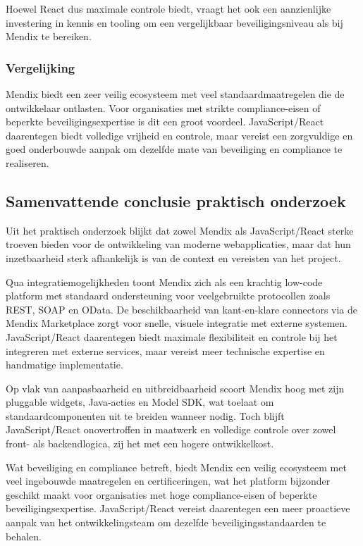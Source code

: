 Hoewel React dus maximale controle biedt, vraagt het ook een aanzienlijke investering in kennis en tooling om een vergelijkbaar beveiligingsniveau als bij Mendix te bereiken.


\subsubsection{Vergelijking}

Mendix biedt een zeer veilig ecosysteem met veel standaardmaatregelen die de ontwikkelaar ontlasten. Voor organisaties met strikte compliance-eisen of beperkte beveiligingsexpertise is dit een groot voordeel. JavaScript/React daarentegen biedt volledige vrijheid en controle, maar vereist een zorgvuldige en goed onderbouwde aanpak om dezelfde mate van beveiliging en compliance te realiseren.


\subsection{Samenvattende conclusie praktisch onderzoek}
Uit het praktisch onderzoek blijkt dat zowel Mendix als JavaScript/React sterke troeven bieden voor de ontwikkeling van moderne webapplicaties, maar dat hun inzetbaarheid sterk afhankelijk is van de context en vereisten van het project.

Qua integratiemogelijkheden toont Mendix zich als een krachtig low-code platform met standaard ondersteuning voor veelgebruikte protocollen zoals REST, SOAP en OData. De beschikbaarheid van kant-en-klare connectors via de Mendix Marketplace zorgt voor snelle, visuele integratie met externe systemen. JavaScript/React daarentegen biedt maximale flexibiliteit en controle bij het integreren met externe services, maar vereist meer technische expertise en handmatige implementatie.

Op vlak van aanpasbaarheid en uitbreidbaarheid scoort Mendix hoog met zijn pluggable widgets, Java-acties en Model SDK, wat toelaat om standaardcomponenten uit te breiden wanneer nodig. Toch blijft JavaScript/React onovertroffen in maatwerk en volledige controle over zowel front- als backendlogica, zij het met een hogere ontwikkelkost.

Wat beveiliging en compliance betreft, biedt Mendix een veilig ecosysteem met veel ingebouwde maatregelen en certificeringen, wat het platform bijzonder geschikt maakt voor organisaties met hoge compliance-eisen of beperkte beveiligingsexpertise. JavaScript/React vereist daarentegen een meer proactieve aanpak van het ontwikkelingsteam om dezelfde beveiligingsstandaarden te behalen.

